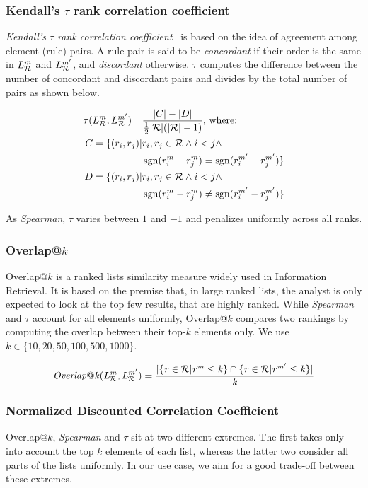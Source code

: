 \subsubsection{Kendall's $\tau$ rank correlation coefficient}

{\em Kendall's $\tau$ rank correlation coefficient}~\cite{KendallBIOMETRIKA38}
is based on the idea of agreement among element (rule) pairs.
A rule pair is said to be \emph{concordant} if their order is the same in
$L_{\mathcal{R}}^m$ and $L_{\mathcal{R}}^{m'}$, and \emph{discordant} otherwise.
$\tau$ computes the difference between the number of concordant and discordant pairs and divides by the total number of pairs as shown below.

\begin{align*}
  \tau(L_{\mathcal{R}}^m,L_{\mathcal{R}}^{m'}) = & \frac{|C|-|D|}{\frac{1}{2}|\mathcal{R}|(|\mathcal{R}|-1)}  \text{, where: }\\
      C=\{(r_i,r_j)|& r_i,r_j\in \mathcal{R}\wedge i<j\wedge \\
                 &\operatorname{sgn}({r_i^m-r_j^m}) = \operatorname{sgn}(r_i^{m'}-r_j^{m'})\} \\
      D=\{(r_i,r_j)|& r_i,r_j\in \mathcal{R}\wedge i<j\wedge \\
                 &\operatorname{sgn}({r_i^m-r_j^m}) \neq \operatorname{sgn}(r_i^{m'}-r_j^{m'})\}
\end{align*}

As {\em Spearman}, $\tau$ varies between $1$ and $-1$ and penalizes uniformly across all ranks.


\subsubsection{Overlap@$k$}

Overlap@$k$ is a ranked lists  similarity measure widely used in Information Retrieval.
It is based on the premise that, in large ranked lists,
the analyst is only expected to look at the top few results, that are highly ranked.
While {\em Spearman} and $\tau$ account for all elements uniformly,
Overlap@$k$ compares two rankings by computing the overlap between their top-$k$ elements only.
We use $k \in \{10, 20, 50, 100, 500, 1000\}$.

$$\mathit{Overlap@k(L_{\mathcal{R}}^m,L_{\mathcal{R}}^{m'})=\frac{|\{r\in \mathcal{R}| r^m\leq k\}\cap\{r\in \mathcal{R}|r^{m'}\leq k\}|}{k}}$$


\subsubsection{Normalized Discounted Correlation Coefficient}
Overlap@$k$, {\em Spearman} and $\tau$ sit at two different extremes.
The first takes only into account the top $k$ elements of each list,
whereas the latter two consider all parts of the lists uniformly.
In our use case, we aim for a good trade-off between these extremes.

